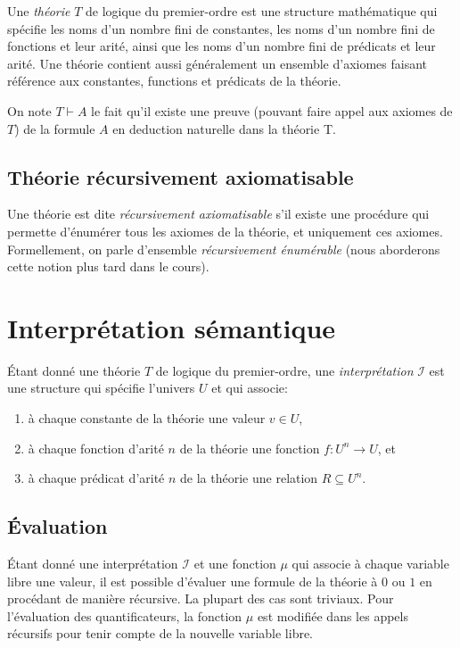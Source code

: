Une \og \textit{théorie} \fg{} $T$ de logique du premier-ordre est une structure mathématique qui spécifie les noms d'un nombre fini de constantes, les noms d'un nombre fini de fonctions et leur arité, ainsi que les noms d'un nombre fini de prédicats et leur arité.
Une théorie contient aussi généralement un ensemble d'axiomes faisant référence aux constantes, functions et prédicats de la théorie.

On note $T \vdash A$ le fait qu'il existe une preuve (pouvant faire appel aux axiomes de $T$) de la formule $A$ en deduction naturelle dans la théorie T.

\subsection{Théorie récursivement axiomatisable}

Une théorie est dite \og \textit{récursivement axiomatisable} \fg{} s'il existe une procédure qui permette d'énumérer tous les axiomes de la théorie, et uniquement ces axiomes. Formellement, on parle d'ensemble \textit{récursivement énumérable} (nous aborderons cette notion plus tard dans le cours).

\section{Interprétation sémantique}

Étant donné une théorie $T$ de logique du premier-ordre, une \og \textit{interprétation} \fg{} $\mathcal{I}$ est une structure qui spécifie l'univers $U$ et qui associe:
\begin{enumerate}
\item à chaque constante de la théorie une valeur $v \in U$,
\item à chaque fonction d'arité $n$ de la théorie une fonction $f : U^n \to U$, et
\item à chaque prédicat d'arité $n$ de la théorie une relation $R \subseteq U^n$.
\end{enumerate}

\subsection{Évaluation}

Étant donné une interprétation $\mathcal{I}$ et une fonction $\mu$ qui associe à chaque variable libre une valeur, il est possible d'évaluer une formule de la théorie à $0$ ou $1$ en procédant de manière récursive.
La plupart des cas sont triviaux. Pour l'évaluation des quantificateurs, la fonction $\mu$ est modifiée dans les appels récursifs pour tenir compte de la nouvelle variable libre.

